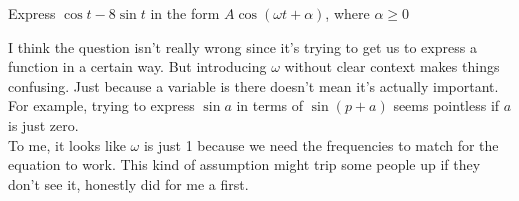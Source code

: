 \documentclass[a4paper, 12pt]{report}
\def\ni{blue!20!white}
\begin{document}
    \newpage
    \begin{tcolorbox}[title=\color{black}{\section{Q4}}, colback=white, colframe=\ni, boxrule=1mm, width=1\textwidth]
        Express \( \cos t-8 \sin t \) in the form \( A \cos (\omega t+\alpha) \), where \( \alpha \geq 0 \)
    \end{tcolorbox}
    \raggedright
    I think the question isn’t really wrong since it’s trying to get us to express a function in a certain way. But introducing \( \omega \) without clear context makes things confusing. Just because a variable is there doesn’t mean it’s actually important. For example, trying to express \(\sin a\) in terms of \(\sin(p + a)\) seems pointless if \(a\) is just zero.\\[1em]
    
    To me, it looks like \( \omega \) is just 1 because we need the frequencies to match for the equation to work. This kind of assumption might trip some people up if they don’t see it, honestly did for me a first.\\[4em]
\end{document}
